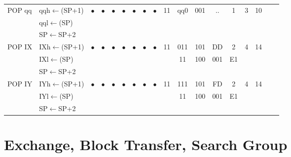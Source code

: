 \documentclass[oneside,a4paper]{book}
\begin{document}
{\begin{tabular}{llcccccccccccccccl}
		POP qq\instrt & 
			qqh$\leftarrow$(SP+1) &
			$\bullet$ & 
				$\bullet$ & 
				$\bullet$ & 
				$\bullet$ & 
				$\bullet$ & 
				$\bullet$ & 
				$\bullet$ & 
			11 & qq0 & 001 & 
			.. & 1 & 
			3 & 10 & \\
		& qql$\leftarrow$(SP) & \\
		& SP$\leftarrow$SP+2 & \instrb \\

		POP IX\instrt & 
			IXh$\leftarrow$(SP+1) &
			$\bullet$ & 
				$\bullet$ & 
				$\bullet$ & 
				$\bullet$ & 
				$\bullet$ & 
				$\bullet$ & 
				$\bullet$ & 
			11 & 011 & 101 & 
			DD & 2 & 
			4 & 14 & \\ 
		& IXl$\leftarrow$(SP) & \multicolumn{8}{c}{} & 11 & 100 & 001 & E1 & & & \\
		& SP$\leftarrow$SP+2 & \instrb \\

		POP IY\instrt &
			IYh$\leftarrow$(SP+1) &
			$\bullet$ & 
				$\bullet$ & 
				$\bullet$ & 
				$\bullet$ & 
				$\bullet$ & 
				$\bullet$ & 
				$\bullet$ & 
			11 & 111 & 101 & 
			FD & 2 & 
			4 & 14 & \\ 
		& IYl$\leftarrow$(SP) & \multicolumn{8}{c}{} & 11 & 100 & 001 & E1 & & & \\
		& SP$\leftarrow$SP+2 & \instrb \\

		\hline

	\end{tabular}
}


\section{Exchange, Block Transfer, Search Group}
\end{document}
